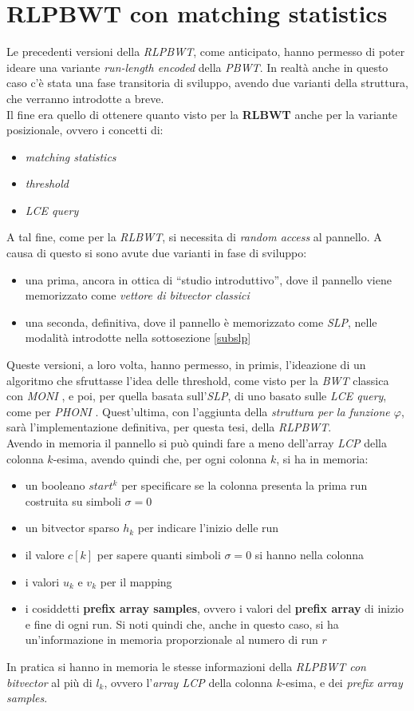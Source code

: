 \section{RLPBWT con matching statistics}
Le precedenti versioni della \textit{RLPBWT}, come anticipato, hanno permesso di
poter ideare una variante \textit{run-length encoded} della \textit{PBWT}.
In realtà anche in questo caso c'è stata una fase transitoria di sviluppo,
avendo due varianti della struttura, che verranno introdotte a breve.\\
Il fine era quello di ottenere quanto visto per la \textbf{RLBWT} anche per la
variante posizionale, ovvero i concetti di:
\begin{itemize}
  \item \textit{matching statistics}
  \item \textit{threshold}
  \item \textit{LCE query}
\end{itemize}
A tal fine, come per la \textit{RLBWT}, si necessita di \textit{random access}
al pannello. A causa di questo si sono avute due varianti in fase di sviluppo:
\begin{itemize}
  \item una prima, ancora in ottica di ``studio introduttivo'', dove il pannello
  viene memorizzato come \textit{vettore di bitvector classici}
  \item una seconda, definitiva, dove il pannello è memorizzato come
  \textit{SLP}, nelle modalità introdotte nella sottosezione \ref{subslp}
\end{itemize}
Queste versioni, a loro volta, hanno permesso, in primis, l'ideazione di un
algoritmo che sfruttasse l'idea delle threshold, come visto per la \textit{BWT}
classica con \textit{MONI} \cite{moni}, e poi, per quella basata
sull'\textit{SLP}, di uno basato sulle \textit{LCE query}, come per
\textit{PHONI} \cite{phoni}. Quest'ultima, con l'aggiunta della
\textit{struttura per la funzione $\varphi$}, sarà l'implementazione definitiva,
per questa tesi, della \textit{RLPBWT}.\\
Avendo in memoria il pannello si può quindi fare a meno dell'array \textit{LCP}
della colonna $k$-esima, avendo quindi che, per ogni colonna $k$, si ha in
memoria:
\begin{itemize}
  \item un booleano $start^k$ per specificare se la colonna presenta la prima
  run costruita su simboli $\sigma =0$
  \item un bitvector sparso $h_k$ per indicare l'inizio delle run
  \item il valore $c[k]$ per sapere quanti simboli $\sigma=0$ si hanno nella
  colonna 
  \item i valori $u_k$ e $v_k$ per il mapping
  \item i cosiddetti \textbf{prefix array samples}, ovvero i valori del
  \textbf{prefix array} di inizio e fine di ogni run. Si noti quindi che, anche
  in questo caso, si ha un'informazione in memoria proporzionale al numero di
  run $r$ 
\end{itemize}
In pratica si hanno in memoria le stesse informazioni della \textit{RLPBWT con
  bitvector} al più di $l_k$, ovvero l'\textit{array LCP} della colonna
$k$-esima, e dei \textit{prefix array samples}. 
